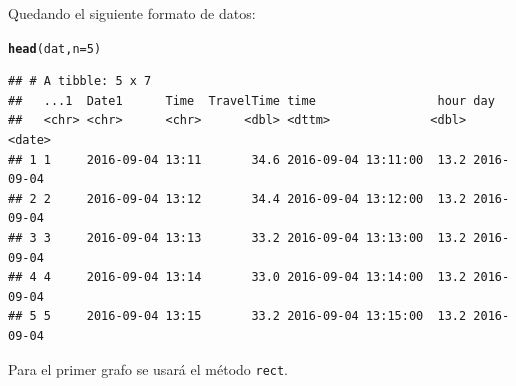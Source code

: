 \documentclass{article}\usepackage[]{graphicx}\usepackage[]{color}
\makeatletter
\newcommand{\hlnum}[1]{\textcolor[rgb]{0.686,0.059,0.569}{#1}}%
\newcommand{\hlstd}[1]{\textcolor[rgb]{0.345,0.345,0.345}{#1}}%
\newcommand{\hlkwc}[1]{\textcolor[rgb]{0.333,0.667,0.333}{#1}}%
\newcommand{\hlkwd}[1]{\textcolor[rgb]{0.737,0.353,0.396}{\textbf{#1}}}%
\newenvironment{kframe}{%
 \def\at@end@of@kframe{}%
 \ifinner\ifhmode%
  \def\at@end@of@kframe{\end{minipage}}%
  \begin{minipage}{\columnwidth}%
 \fi\fi%
 \def\FrameCommand##1{\hskip\@totalleftmargin \hskip-\fboxsep
 \colorbox{shadecolor}{##1}\hskip-\fboxsep
     \hskip-\linewidth \hskip-\@totalleftmargin \hskip\columnwidth}%
 \MakeFramed {\advance\hsize-\width
   \@totalleftmargin\z@ \linewidth\hsize
   \@setminipage}}%
 {\par\unskip\endMakeFramed%
 \at@end@of@kframe}
\newenvironment{knitrout}{}{} %
\makeatother
\begin{document}
\clearpage
Quedando el siguiente formato de datos:
\begin{knitrout}
\color{fgcolor}\begin{kframe}
\begin{alltt}
\hlkwd{head}\hlstd{(dat,} \hlkwc{n}\hlstd{=}\hlnum{5}\hlstd{)}
\end{alltt}
\begin{verbatim}
## # A tibble: 5 x 7
##   ...1  Date1      Time  TravelTime time                 hour day       
##   <chr> <chr>      <chr>      <dbl> <dttm>              <dbl> <date>    
## 1 1     2016-09-04 13:11       34.6 2016-09-04 13:11:00  13.2 2016-09-04
## 2 2     2016-09-04 13:12       34.4 2016-09-04 13:12:00  13.2 2016-09-04
## 3 3     2016-09-04 13:13       33.2 2016-09-04 13:13:00  13.2 2016-09-04
## 4 4     2016-09-04 13:14       33.0 2016-09-04 13:14:00  13.2 2016-09-04
## 5 5     2016-09-04 13:15       33.2 2016-09-04 13:15:00  13.2 2016-09-04
\end{verbatim}
\end{kframe}
\end{knitrout}
Para el primer grafo se usar\'a el m\'etodo \texttt{rect}.
\end{document}
